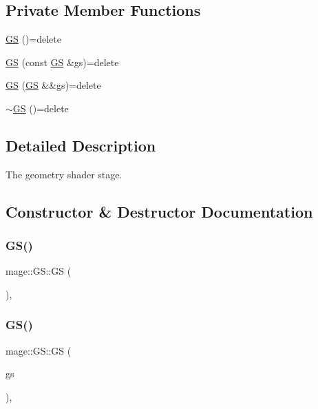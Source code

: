 \subsection*{Private Member Functions}
\begin{DoxyCompactItemize}
\item 
\hyperlink{structmage_1_1_g_s_a87104830391b63eaf7c354befff55ad2}{GS} ()=delete
\item 
\hyperlink{structmage_1_1_g_s_a05eebad9fda23e9223216ce10b4e8fec}{GS} (const \hyperlink{structmage_1_1_g_s}{GS} \&gs)=delete
\item 
\hyperlink{structmage_1_1_g_s_ad9319b08f3d894d332a320c452fcac98}{GS} (\hyperlink{structmage_1_1_g_s}{GS} \&\&gs)=delete
\item 
\hyperlink{structmage_1_1_g_s_afa17e197c35f997deb6bfd08c69271f8}{$\sim$\+GS} ()=delete
\end{DoxyCompactItemize}


\subsection{Detailed Description}
The geometry shader stage. 

\subsection{Constructor \& Destructor Documentation}
\hypertarget{structmage_1_1_g_s_a87104830391b63eaf7c354befff55ad2}{}\label{structmage_1_1_g_s_a87104830391b63eaf7c354befff55ad2} 
\subsubsection{\texorpdfstring{G\+S()}{GS()}\hspace{0.1cm}{\footnotesize\ttfamily [1/3]}}
{\footnotesize\ttfamily mage\+::\+G\+S\+::\+GS (\begin{DoxyParamCaption}{ }\end{DoxyParamCaption})\hspace{0.3cm}{\ttfamily [private]}, {\ttfamily [delete]}}

\hypertarget{structmage_1_1_g_s_a05eebad9fda23e9223216ce10b4e8fec}{}\label{structmage_1_1_g_s_a05eebad9fda23e9223216ce10b4e8fec} 
\subsubsection{\texorpdfstring{G\+S()}{GS()}\hspace{0.1cm}{\footnotesize\ttfamily [2/3]}}
{\footnotesize\ttfamily mage\+::\+G\+S\+::\+GS (\begin{DoxyParamCaption}\item[{const \hyperlink{structmage_1_1_g_s}{GS} \&}]{gs }\end{DoxyParamCaption})\hspace{0.3cm}{\ttfamily [private]}, {\ttfamily [delete]}}

